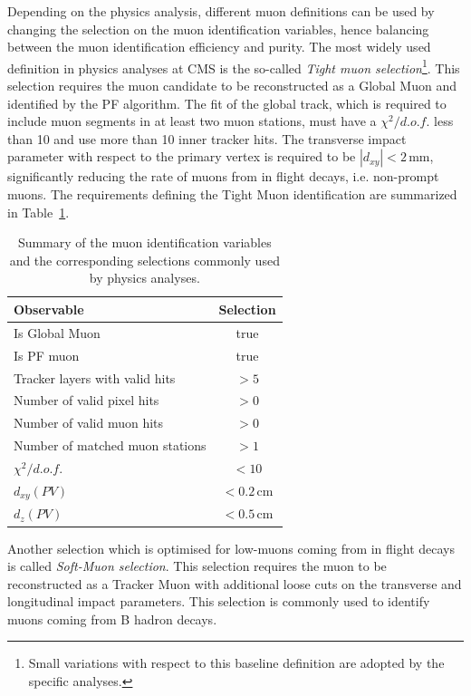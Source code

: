 Depending on the physics analysis, different muon definitions can be used by changing the selection on the muon identification variables, hence balancing between the muon identification efficiency and purity. The most widely used definition in physics analyses at CMS is the so-called \emph{Tight muon selection}\footnote{Small variations with respect to this baseline definition are adopted by the specific analyses.}. This selection requires the muon candidate to be reconstructed as a Global Muon and identified by the PF algorithm. The fit of the global track, which is required to include muon segments in at least two muon stations, must have a $\chi^2/d.o.f.$ less than 10 and use more than 10 inner tracker hits. The transverse impact parameter with respect to the primary vertex is required to be $|d_{xy}|<2$\,mm, significantly reducing the rate of muons from in flight decays, i.e. non-prompt muons. The requirements defining the Tight Muon identification are summarized in Table~\ref{tab:tightmuon}.

\begin{table}[htb]
\caption{Summary of the muon identification variables and the corresponding selections commonly used by physics analyses.}\label{tab:tightmuon}
\centering
\begin{tabular}{lc}
\toprule
Observable & Selection \\
\midrule
Is Global Muon & true \\
Is PF muon & true \\
Tracker layers with valid hits & $>5$ \\
Number of valid pixel hits & $>0$ \\
Number of valid muon hits & $>0$ \\
Number of matched muon stations & $>1$ \\
$\chi^2/d.o.f.$ & $<10$ \\
$d_{xy}(PV)$ & $< 0.2$\,cm \\
$d_{z}(PV)$ & $< 0.5$\,cm \\
\bottomrule
\end{tabular}
\end{table}

Another selection which is optimised for low-\pt muons coming from in flight decays is called \emph{Soft-Muon selection}. This selection requires the muon to be reconstructed as a Tracker Muon with additional loose cuts on the transverse and longitudinal impact parameters. This selection is commonly used to identify muons coming from B hadron decays.

